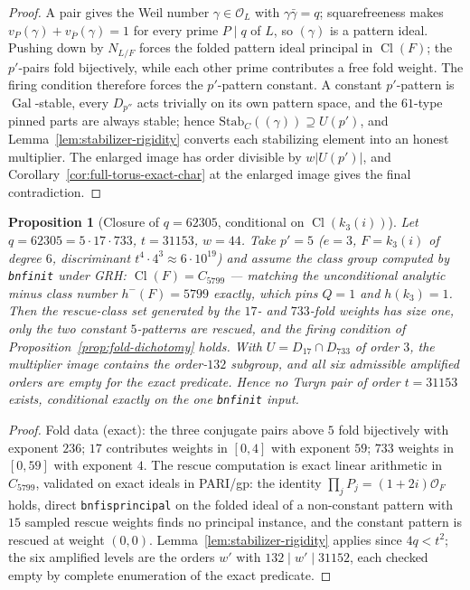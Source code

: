 \documentclass[11pt]{article}
\theoremstyle{plain}
\newtheorem{proposition}[theorem]{Proposition}
\theoremstyle{definition}
\theoremstyle{remark}
\newcommand{\Cl}{\operatorname{Cl}}
\newcommand{\Gal}{\operatorname{Gal}}
\begin{document}
\begin{proof}
A pair gives the Weil number $\gamma\in\mathcal O_L$ with
$\gamma\bar\gamma=q$; squarefreeness makes
$v_P(\gamma)+v_{\bar P}(\gamma)=1$ for every prime $P\mid q$ of $L$, so
$(\gamma)$ is a pattern ideal.  Pushing down by $N_{L/F}$ forces the
folded pattern ideal principal in $\Cl(F)$; the $p'$-pairs fold
bijectively, while each other prime contributes a free fold weight.
The firing condition therefore forces the $p'$-pattern constant.  A
constant $p'$-pattern is $\Gal$-stable, every $D_{p''}$ acts trivially
on its own pattern space, and the $61$-type pinned parts are always
stable; hence $\mathrm{Stab}_C((\gamma))\supseteq U(p')$, and
Lemma~\ref{lem:stabilizer-rigidity} converts each stabilizing element
into an honest multiplier.  The enlarged image has order divisible by
$w|U(p')|$, and Corollary~\ref{cor:full-torus-exact-char} at the
enlarged image gives the final contradiction.
\end{proof}

\begin{proposition}[Closure of $q=62305$, conditional on
$\Cl(k_3(i))$]\label{prop:q62305-closure}
Let $q=62305=5\cdot17\cdot733$, $t=31153$, $w=44$.  Take $p'=5$
($e=3$, $F=k_3(i)$ of degree $6$, discriminant
$t^4\cdot4^3\approx6\cdot10^{19}$) and assume the class group computed
by \texttt{bnfinit} under GRH: $\Cl(F)=C_{5799}$ --- matching the
\emph{unconditional} analytic minus class number $h^-(F)=5799$
exactly, which pins $Q=1$ and $h(k_3)=1$.  Then the rescue-class set
generated by the $17$- and $733$-fold weights has size one, only the
two constant $5$-patterns are rescued, and the firing condition of
Proposition~\ref{prop:fold-dichotomy} holds.  With
$U=D_{17}\cap D_{733}$ of order $3$, the multiplier image contains the
order-$132$ subgroup, and all six admissible amplified orders are
empty for the exact predicate.  Hence no Turyn pair of order
$t=31153$ exists, conditional exactly on the one \texttt{bnfinit}
input.
\end{proposition}

\begin{proof}
Fold data (exact): the three conjugate pairs above $5$ fold
bijectively with exponent $236$; $17$ contributes weights in $[0,4]$
with exponent $59$; $733$ weights in $[0,59]$ with exponent $4$.  The
rescue computation is exact linear arithmetic in $C_{5799}$, validated
on exact ideals in PARI/gp: the identity
$\prod_jP_j=(1+2i)\mathcal O_F$ holds, direct
\texttt{bnfisprincipal} on the folded ideal of a non-constant pattern
with $15$ sampled rescue weights finds no principal instance, and the
constant pattern is rescued at weight $(0,0)$.
Lemma~\ref{lem:stabilizer-rigidity} applies since $4q<t^2$; the six
amplified levels are the orders $w'$ with $132\mid w'\mid31152$, each
checked empty by complete enumeration of the exact predicate.
\end{proof}
\end{document}

